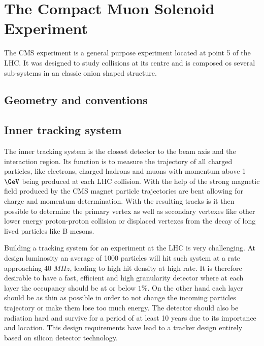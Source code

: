 \section{The Compact Muon Solenoid Experiment}
\label{SECTION:ExperimentalApparatus_CMS}

The \gls{CMS} experiment is a general purpose experiment located at point 5 of the \gls{LHC}. It was designed to study collisions at its centre and is composed os several sub-systems in an classic onion shaped structure.


\subsection{Geometry and conventions}


\subsection{Inner tracking system}
\label{SUBSECTION:ExperimentalApparatus_CMS_Tracker}

%

The inner tracking system is the closest detector to the beam axis and the interaction region. Its function is to measure the trajectory of all charged particles, like electrons, charged hadrons and muons with momentum above 1 $\GeV$ being produced at each \gls{LHC} collision. With the help of the strong magnetic field produced by the \gls{CMS} magnet particle trajectories are bent allowing for charge and momentum determination. With the resulting tracks is it then possible to determine the primary vertex as well as secondary vertexes like other lower energy proton-proton collision or displaced vertexes from the decay of long lived particles like B mesons.

Building a tracking system for an experiment at the \gls{LHC} is very challenging. At design luminosity an average of 1000 particles will hit such system at a rate approaching 40 $MHz$, leading to high hit density at high rate. It is therefore desirable to have a fast, efficient and high granularity detector where at each layer the occupancy should be at or below $1\%$. On the other hand each layer should be as thin as possible in order to not change the incoming particles trajectory or make them lose too much energy. The detector should also be radiation hard and survive for a period of at least 10 years due to its importance and location. This design requirements have lead to a tracker design entirely based on silicon detector technology. 

